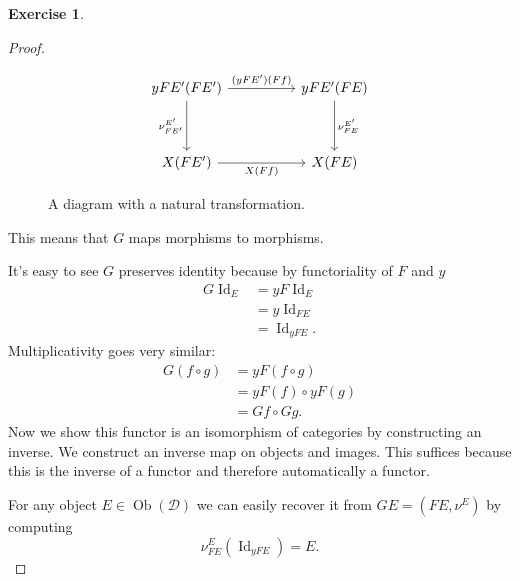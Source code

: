 \documentclass{article}
\DeclareMathOperator{\Id}{Id}
\newcommand{\catt}{\mathcal{D}}
\DeclareMathOperator{\objects}{Ob}
\theoremstyle{definition}
\newtheorem{question}{Exercise}
\begin{document}
\begin{question}
\begin{enumerate}[(a)]
\begin{proof}
                  \begin{figure}[H]
                      \[
                          \begin{tikzcd}[ampersand replacement=\&]
                              {yFE'(FE')} \&\& {yFE'(FE)} \\
                              \\
                              {X(FE')} \&\& {X(FE)}
                              \arrow["{(yFE')(Ff)}", from=1-1, to=1-3]
                              \arrow["{\nu^{E'}_{FE}}", from=1-3, to=3-3]
                              \arrow["{\nu^{E'}_{FE'}}"', from=1-1, to=3-1]
                              \arrow["{X(Ff)}"', from=3-1, to=3-3]
                          \end{tikzcd}
                      \]
                      \caption{A diagram with a natural transformation.}
                      \label{fig:comm-dia-5}
                  \end{figure}
                  This means that \(G\) maps morphisms to morphisms.

                  It's easy to see \(G\) preserves identity because
                  by functoriality of \(F\) and \(y\)
                  \begin{align*}
                      G\Id_{E} & =yF\Id_{E}  \\
                               & =y\Id_{FE}  \\
                               & =\Id_{yFE}.
                  \end{align*}
                  Multiplicativity goes very similar:
                  \begin{align*}
                      G(f\circ g) & =yF(f\circ g)     \\
                                  & =yF(f)\circ yF(g) \\
                                  & =Gf\circ Gg.
                  \end{align*}
                  Now we show this functor is an isomorphism of categories by
                  constructing an inverse. We construct an inverse map on
                  objects and images. This suffices because this is the inverse
                  of a functor and therefore automatically a functor.

                  For any object \(E\in\objects(\catt)\) we can easily recover
                  it from \(GE=(FE,\nu^{E})\) by computing
                  \[
                      \nu^{E}_{FE}(\Id_{yFE})=E.
                  \]


\end{proof}
\end{enumerate}
\end{question}
\end{document}
